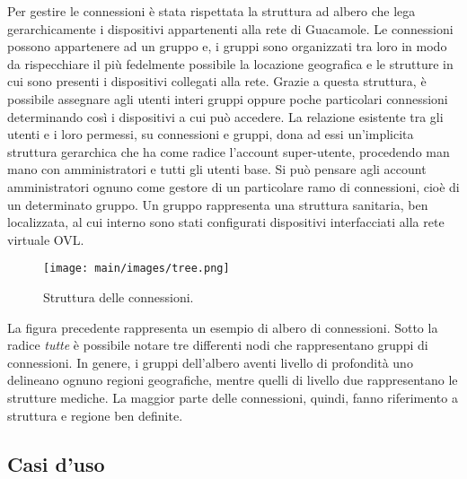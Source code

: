 Per gestire le connessioni è stata rispettata la struttura ad albero che lega gerarchicamente i dispositivi appartenenti alla rete di Guacamole. Le connessioni possono appartenere ad un gruppo e, i gruppi sono organizzati tra loro in modo da rispecchiare il più fedelmente possibile la locazione geografica e le strutture in cui sono presenti i dispositivi collegati alla rete. Grazie a questa struttura, è possibile assegnare agli utenti interi gruppi oppure poche particolari connessioni determinando così i dispositivi a cui può accedere.
La relazione esistente tra gli utenti e i loro permessi, su connessioni e gruppi, dona ad essi un'implicita struttura gerarchica che ha come radice l'account super-utente, procedendo man mano con amministratori e tutti gli utenti base. Si può pensare agli account amministratori ognuno come gestore di un particolare ramo di connessioni, cioè di un determinato gruppo. Un gruppo rappresenta una struttura sanitaria, ben localizzata, al cui interno sono stati configurati dispositivi interfacciati alla rete virtuale OVL. 

\begin{figure}
\begin{center}
\texttt{[image: main/images/tree.png]}
\end{center}
\caption{Struttura delle connessioni.}
\label{fig:tree}
\end{figure}

La figura precedente rappresenta un esempio di albero di connessioni.
Sotto la radice \textit{tutte} è possibile notare tre differenti nodi che rappresentano gruppi di connessioni. In genere, i gruppi dell'albero aventi livello di profondità uno delineano ognuno regioni geografiche, mentre quelli di livello due rappresentano le strutture mediche. La maggior parte delle connessioni, quindi, fanno riferimento a struttura e regione ben definite. 

\subsection{Casi d'uso}
\label{sec:casi d'uso}

